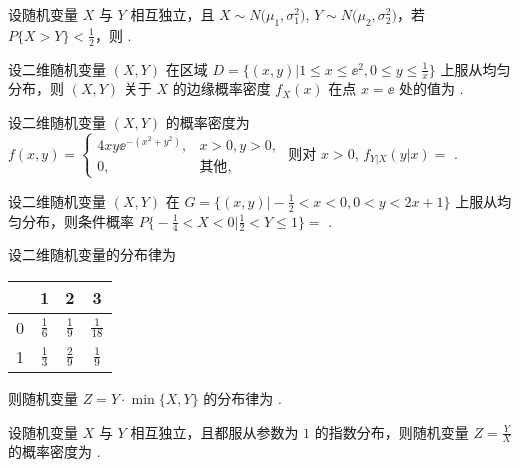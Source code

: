 	\begin{titwo}
		设随机变量 $X$ 与 $Y$ 相互独立，且 $X \sim N \bigl( \mu_{1},\sigma_{1}^{2} \bigr)$, $Y \sim N\bigl( \mu_{2},\sigma_{2}^{2} \bigr)$，若 $P\{ X > Y \} < \frac{1}{2}$，则 \kuo.

	\end{titwo}

	\begin{titwo}
		设二维随机变量 $(X,Y)$ 在区域 $D = \bigl\{ (x,y) \bigl| 1 \leq x \leq \ee^{2}, 0 \leq y \leq \frac{1}{x} \bigr\}$ 上服从均匀分布，则 $(X,Y)$ 关于 $X$ 的边缘概率密度 $f_{X}(x)$ 在点 $x = \ee$ 处的值为 \htwo.
	\end{titwo}

	\begin{titwo}
		设二维随机变量 $(X,Y)$ 的概率密度为 $f(x,y) = \begin{cases}
			4xy \ee^{-( x^{2} + y^{2} )}, & x > 0, y > 0, \\
			0, & \text{其他},
		\end{cases}$ 则对 $x > 0$, $f_{Y|X} (y|x) = $ \htwo.
	\end{titwo}

	\begin{titwo}
		设二维随机变量 $(X,Y)$ 在 $G = \bigl\{ (x,y) \bigl| - \frac{1}{2} < x < 0, 0 < y < 2x + 1 \bigr\}$ 上服从均匀分布，则条件概率 $P \bigl\{ - \frac{1}{4} < X < 0 \bigl| \frac{1}{2} < Y \leq 1 \bigr\} = $ \htwo.
	\end{titwo}

	\begin{titwo}
		设二维随机变量的分布律为
		\begin{center}
			\begin{tabular}{c|ccc}
				\hline
				\diagbox{$X$}{$Y$} & 1 & 2 & 3 \\
				\hline
				0 & $\frac{1}{6}$ & $\frac{1}{9}$ & $\frac{1}{18}$ \\
				1 & $\frac{1}{3}$ & $\frac{2}{9}$ & $\frac{1}{9}$ \\
				\hline
			\end{tabular}
		\end{center}
		则随机变量 $Z = Y \cdot \min\{ X,Y \}$ 的分布律为 \htwo.
	\end{titwo}

	\begin{titwo}
		设随机变量 $X$ 与 $Y$ 相互独立，且都服从参数为 $1$ 的指数分布，则随机变量 $Z = \frac{Y}{X}$ 的概率密度为 \htwo.
	\end{titwo}

